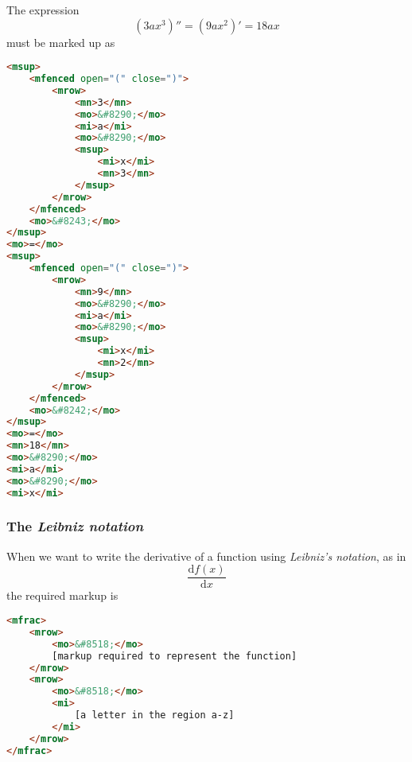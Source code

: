 \documentclass[english,a4paper,11pt]{article}
\begin{document}

\begin{examples}
The expression 
\begin{equation}
(3 a x^3)'' = (9 ax^2)' = 18 a x
\end{equation}
must be marked up as
\begin{lstlisting}[language=HTML]
<msup>
	<mfenced open="(" close=")">
		<mrow>
			<mn>3</mn>
			<mo>&#8290;</mo>
			<mi>a</mi>
			<mo>&#8290;</mo>
			<msup>
				<mi>x</mi>
				<mn>3</mn>
			</msup>
		</mrow>
	</mfenced>
	<mo>&#8243;</mo>
</msup>
<mo>=</mo>
<msup>
	<mfenced open="(" close=")">
		<mrow>
			<mn>9</mn>
			<mo>&#8290;</mo>
			<mi>a</mi>
			<mo>&#8290;</mo>
			<msup>
				<mi>x</mi>
				<mn>2</mn>
			</msup>
		</mrow>
	</mfenced>
	<mo>&#8242;</mo>
</msup>
<mo>=</mo>
<mn>18</mn>
<mo>&#8290;</mo>
<mi>a</mi>
<mo>&#8290;</mo>
<mi>x</mi>
\end{lstlisting}


\end{examples}

\subsubsection{The \emph{Leibniz notation}}
When we want to write the derivative of a function using \emph{Leibniz's notation}, as in
\begin{equation}
\frac{\text{d}f(x)}{\text{d}x}
\end{equation}
the required markup is

\begin{lstlisting}[language=HTML]
<mfrac>
	<mrow>
		<mo>&#8518;</mo>
		[markup required to represent the function]
	</mrow>
	<mrow>
		<mo>&#8518;</mo>
		<mi>
			[a letter in the region a-z]
		</mi>
	</mrow>
</mfrac>
\end{lstlisting}
\end{document}
